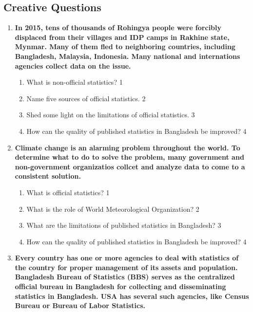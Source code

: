 \documentclass[a4paper,oneside]{book}
\begin{document}
\begin{enumerate}
\section{Creative Questions}

  \begin{enumerate}
 \item
	  \textbf{In 2015, tens of thousands of Rohingya people were forcibly displaced from their villages and IDP camps in Rakhine state, Mynmar. Many of them fled to neighboring countries, including Bangladesh, Malaysia, Indonesia. Many national and internations agencies collect data on the issue.} 
  
  \begin{enumerate}
    \item
	What is non-official statistics? \hfill 1
    \item
	Name five sources of official statistics. \hfill 2
    \item  
	Shed some light on the limitations of official statistics. \hfill 3
    \item
	How can the quality of published statistics in Bangladesh be improved? \hfill 4
  \end{enumerate}
  
   \item
	  \textbf{Climate change is an alarming problem throughout the world. To determine what to do to solve the problem, many government and non-government organizatios collcet and analyze data  to come to a consistent solution.} 
  
  \begin{enumerate}
    \item
	What is official statistics?  \hfill 1
    \item
	What is the role of World Meteorological Organization? \hfill 2
    \item  
	What are the limitations of published statistics in Bangladesh? \hfill 3
    \item
	How can the quality of published statistics in Bangladesh be improved? \hfill 4
  \end{enumerate}


   \item
	  \textbf{Every country has one or more agencies to deal with statistics of 
	  the country for proper management of its assets and population. Bangladesh
	  Bureau of Statistics (BBS) serves as the centralized official bureau in 
	  Bangladesh for collecting and disseminating statistics in Bangladesh. 
	  USA has several such agencies, like Census Bureau or Bureau of Labor 
	  Statistics.} 
  

\end{enumerate}
\end{enumerate}
\end{document}
